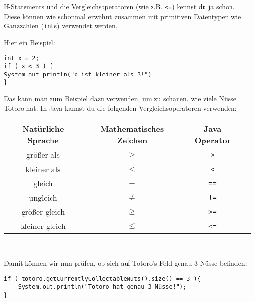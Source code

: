 \begin{Infobox}[If-Statements 2]

	If-Statements und die Vergleichsoperatoren (wie z.B. \lstinline{<=}) kennst du ja schon.
Diese können wie schonmal erwähnt zusammen mit primitiven Datentypen wie Ganzzahlen (\lstinline{int}s) verwendet werden.\newline

Hier ein Beispiel:

\begin{lstlisting}[numbers=none]
int x = 2;
if ( x < 3 ) {
System.out.println("x ist kleiner als 3!");
}
\end{lstlisting}

Das kann man zum Beispiel dazu verwenden, um zu schauen, wie viele Nüsse Totoro hat.
In Java kannst du die folgenden Vergleichsoperatoren verwenden:
	\begin{center}
		\begin{tabular}{ c | c | c | l }
			Natürliche Sprache & Mathematisches Zeichen & Java Operator \\
			\hline
			größer als & $>$ & \texttt{>} \\
			kleiner als & $<$ & \texttt{<} \\
			gleich & $=$ & \texttt{==}\\
			ungleich & $\neq$ & \texttt{!=} \\
			größer gleich & $\geq$ & \texttt{>=} \\
			kleiner gleich & $\leq$ & \texttt{<=} \\
        \end{tabular} \\
	\end{center}

	Damit können wir nun prüfen, ob sich auf Totoro's Feld genau 3 Nüsse befinden:

	\begin{lstlisting}[numbers=none]
if ( totoro.getCurrentlyCollectableNuts().size() == 3 ){
	System.out.println("Totoro hat genau 3 Nüsse!");
}
	\end{lstlisting}
\end{Infobox}


